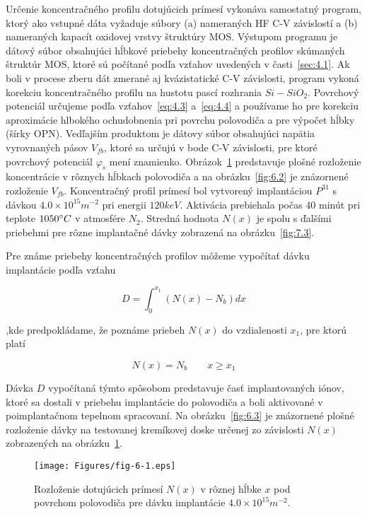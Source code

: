 Určenie koncentračného profilu dotujúcich prímesí vykonáva samostatný
program, ktorý ako vstupné dáta vyžaduje súbory (a) nameraných HF C-V
závislostí a (b) nameraných kapacít oxidovej vrstvy štruktúry
MOS\@. Výstupom programu je dátový súbor obsahujúci hĺbkové priebehy
koncentračných profilov skúmaných štruktúr MOS, ktoré sú počítané
podľa vzťahov uvedených v časti~\ref{sec:4.1}. Ak boli v procese zberu
dát zmerané aj kvázistatické C-V závislosti, program vykoná korekciu
koncentračného profilu na hustotu pascí rozhrania
$Si-SiO_2$. Povrchový potenciál určujeme podľa vzťahov~\ref{eq:4.3}
a~\ref{eq:4.4} a používame ho pre korekciu aproximácie hlbokého
ochudobnenia pri povrchu polovodiča a pre výpočet hĺbky (šírky
OPN). Vedľajším produktom je dátovy súbor obsahujúci napätia
vyrovnaných pásov $V_{fb}$, ktoré sa určujú v bode C-V závislosti, pre
ktoré povrchový potenciál $\varphi_s$ mení
znamienko. Obrázok~\ref{fig:6.1} predstavuje plošné rozloženie
koncentrácie v rôznych hĺbkach polovodiča a na obrázku~\ref{fig:6.2}
je znázornené rozloženie $V_{fb}$. Koncentračný profil prímesí bol
vytvorený implantáciou $P^{31}$ s dávkou $4.0 \times 10^{15} m^{-2}$
pri energii $120 keV$. Aktivácia prebiehala počas 40 minút pri teplote
$1050 \degree C$ v atmosfére $N_2$. Stredná hodnota $N(x)$ je spolu s
ďalšími priebehmi pre rôzne implantačné dávky zobrazená na
obrázku~\ref{fig:7.3}.

Pre známe priebehy koncentračných profilov môžeme vypočítať dávku
implantácie podľa vzťahu

\begin{equation}\label{eq:6.1}
  D = \int_{0}^{x_{1}}(N(x) - N_{b}) dx
\end{equation}

,kde predpokládame, že poznáme priebeh $N(x)$ do vzdialenosti $x_{1}$,
pre ktorú platí

\begin{equation}\label{eq:6.2}
  N(x) = N_{b} \qquad {x \ge x_{1}}
\end{equation}

Dávka $D$ vypočítaná týmto spôsobom predstavuje časť implantovaných
iónov, ktoré sa dostali v priebehu implantácie do polovodiča a boli
aktivované v poimplantačnom tepelnom spracovaní. Na
obrázku~\ref{fig:6.3} je znázornené plošné rozloženie dávky na
testovanej kremíkovej doske určenej zo závislosti $N(x)$ zobrazených
na obrázku~\ref{fig:6.1}.

\begin{figure}[h!]\centering
  \texttt{[image: Figures/fig-6-1.eps]}%
  \caption[Rozloženie dotujúcich prímesí $N(x)$ v rôznej hĺbke
    $x$]{Rozloženie dotujúcich prímesí $N(x)$ v rôznej hĺbke $x$ pod
    povrchom polovodiča pre dávku implantácie $4.0 \times
    10^{15}m^{-2}$.}\label{fig:6.1}
\end{figure}

